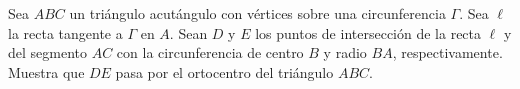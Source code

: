 Sea $ABC$ un triángulo acutángulo con vértices sobre una circunferencia $\Gamma$. Sea $\ell$ la recta
tangente a $\Gamma$ en $A$. Sean $D$ y $E$ los puntos de intersección de la recta $\ell$ y del segmento $AC$ con la circunferencia de centro $B$ y radio $BA$, respectivamente. Muestra que $DE$ pasa por el ortocentro del triángulo $ABC$.